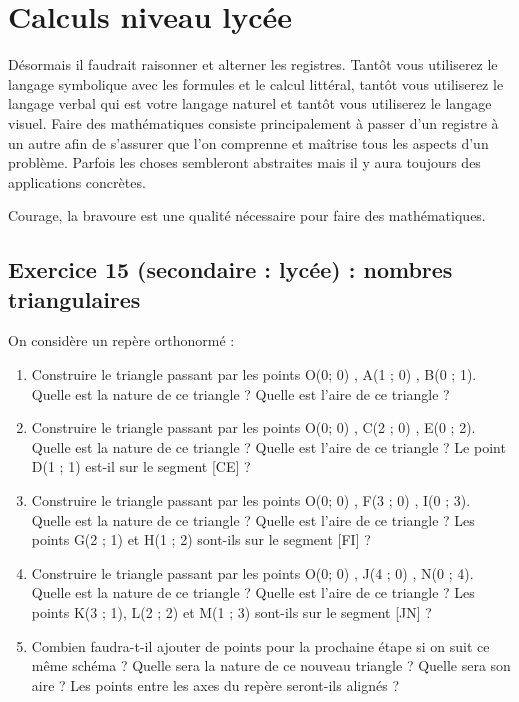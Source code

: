 \section{Calculs niveau lycée}

Désormais il faudrait raisonner et alterner les registres. Tantôt vous utiliserez le langage symbolique avec les formules et le calcul littéral, tantôt vous utiliserez le langage verbal qui est votre langage naturel et tantôt vous utiliserez le langage visuel. Faire des mathématiques consiste principalement à passer d'un registre à un autre afin de s'assurer que l'on comprenne et maîtrise tous les aspects d'un problème. Parfois les choses sembleront abstraites mais il y aura toujours des applications concrètes. 

Courage, la bravoure est une qualité nécessaire pour faire des mathématiques.

\newpage

\subsection{Exercice 15 (secondaire : lycée) : nombres triangulaires}

\label{geom:niveau15}

On considère un repère orthonormé :

\begin{enumerate}[label=G\arabic*)]
	\item Construire le triangle passant par les points O(0; 0) , A(1 ; 0) , B(0 ; 1). Quelle est la nature de ce triangle ? Quelle est l'aire de ce triangle ?
	\item Construire le triangle passant par les points O(0; 0) , C(2 ; 0) , E(0 ; 2). Quelle est la nature de ce triangle ? Quelle est l'aire de ce triangle ? Le point D(1 ; 1) est-il sur le segment [CE] ?
	\item Construire le triangle passant par les points O(0; 0) , F(3 ; 0) , I(0 ; 3). Quelle est la nature de ce triangle ? Quelle est l'aire de ce triangle ? Les points G(2 ; 1) et H(1 ; 2) sont-ils sur le segment [FI] ?
	\item Construire le triangle passant par les points O(0; 0) , J(4 ; 0) , N(0 ; 4). Quelle est la nature de ce triangle ? Quelle est l'aire de ce triangle ? Les points K(3 ; 1), L(2 ; 2) et M(1 ; 3) sont-ils sur le segment [JN] ?
	\item Combien faudra-t-il ajouter de points pour la prochaine étape si on suit ce même schéma ? Quelle sera la nature de ce nouveau triangle ? Quelle sera son aire ? Les points entre les axes du repère seront-ils alignés ?
\end{enumerate}

